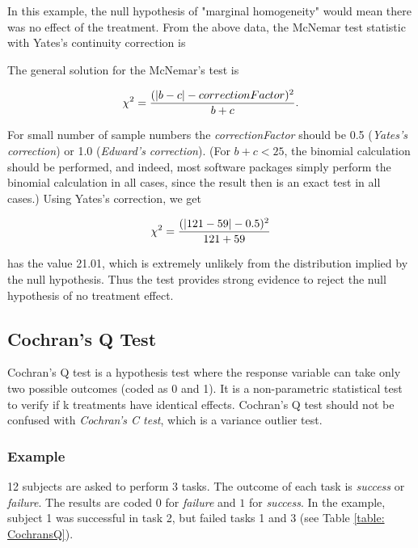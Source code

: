 In this example, the null hypothesis of "marginal homogeneity" would mean there was no effect of the treatment. From the above data, the McNemar test statistic with Yates's continuity correction is

The general solution for the McNemar's test is

\begin{equation}
    \chi^2 = {(|b-c|-correctionFactor)^2 \over b+c}.
\end{equation}

For small number of sample numbers the \emph{correctionFactor} should be 0.5 (\emph{Yates's correction}) or 1.0 (\emph{Edward's correction}). (For $b + c < 25$, the binomial calculation should be performed, and indeed, most software packages simply perform the binomial calculation in all cases, since the result then is an exact test in all cases.) Using Yates's correction, we get

\begin{equation}
    \chi^2 = {(|121 - 59| - 0.5)^2 \over {121 + 59}}
\end{equation}

has the value 21.01, which is extremely unlikely from the distribution implied by the null hypothesis. Thus the test provides strong evidence to reject the null hypothesis of no treatment effect.


\subsection{Cochran's Q Test}

Cochran's Q test is a hypothesis test where the response variable can take only two possible outcomes (coded as 0 and 1). It is a non-parametric statistical test to verify if k treatments have identical effects. Cochran's Q test should not be confused with \emph{Cochran's C test}, which is a variance outlier test.

\subsubsection{Example}

12 subjects are asked to perform 3 tasks. The outcome of each task is \emph{success} or \emph{failure}. The results are coded $0$ for \emph{failure} and $1$ for \emph{success}. In the example, subject 1 was successful in task 2, but failed tasks 1 and 3 (see Table \ref{table: CochransQ}).

